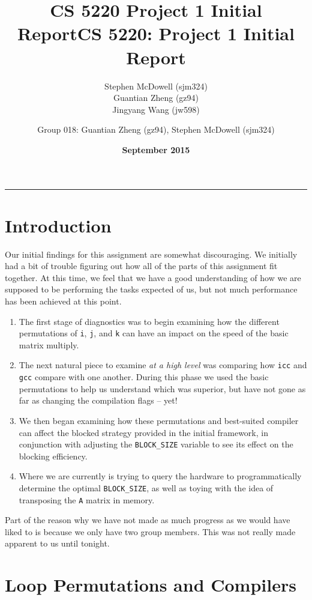 \documentclass[11pt]{article}
\title{\textbf{CS 5220 Project 1 Initial Report}}
\author{Stephen McDowell (sjm324)\\ Guantian Zheng (gz94)\\ Jingyang Wang (jw598)}
\date{\textbf{September 2015}}
\title{CS 5220: Project 1 Initial Report}
\author{Group 018: Guantian Zheng (gz94), Stephen McDowell (sjm324)}
\makeatletter
\renewcommand{\maketitle}{\bgroup\setlength{\parindent}{0pt}
\begin{flushleft}
  {\Large \textsc{\@title}}\newline
  \textsc{\@author}
  \rule{\textwidth}{1pt}
\end{flushleft}\egroup
}
\makeatother
\begin{document}
\thispagestyle{empty}
\maketitle

\section{Introduction}

Our initial findings for this assignment are somewhat discouraging.  We initially had a bit of trouble figuring out how all of the parts of this assignment fit together.  At this time, we feel that we have a good understanding of how we are supposed to be performing the tasks expected of us, but not much performance has been achieved at this point.

\begin{enumerate}
    \item The first stage of diagnostics was to begin examining how the different permutations of \texttt{i}, \texttt{j}, and \texttt{k} can have an impact on the speed of the basic matrix multiply.

    \item The next natural piece to examine \emph{at a high level} was comparing how \texttt{icc} and \texttt{gcc} compare with one another.  During this phase we used the basic permutations to help us understand which was superior, but have not gone as far as changing the compilation flags -- yet!

    \item We then began examining how these permutations and best-suited compiler can affect the blocked strategy provided in the initial framework, in conjunction with adjusting the \texttt{BLOCK\_SIZE} variable to see its effect on the blocking efficiency.

    \item Where we are currently is trying to query the hardware to programmatically determine the optimal \texttt{BLOCK\_SIZE}, as well as toying with the idea of transposing the \texttt{A} matrix in memory.
\end{enumerate}

\noindent Part of the reason why we have not made as much progress as we would have liked to is because we only have two group members.  This was not really made apparent to us until tonight.

\newpage
\section{Loop Permutations and Compilers}
\end{document}
